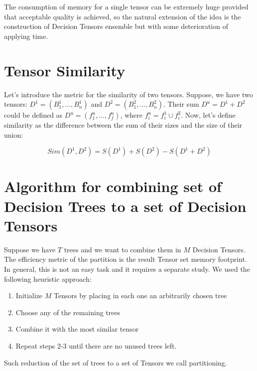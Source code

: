 \documentclass[a4paper]{jpconf}
\begin{document}
The consumption of memory for a single tensor can be extremely huge provided that acceptable quality is achieved, so the natural extension of the idea is the construction of Decision Tensors ensemble but with some deterioration of applying time.

\section{Tensor Similarity}
Let's introduce the metric for the similarity of two tensors. Suppose, we have two tensors: $D^1 = (B^{1}_{1}, ..., B^{1}_{n})$ and $D^2 = (B^{2}_{1}, ..., B^{2}_{n})$. Their sum $D^u = D^1 + D^2$ could be defined as $D^u = (f^{u}_{1}, ..., f^{u}_{f})$, where $f^{u}_{i} = f^{1}_{i} \cup f^{2}_{i}$. Now, let's define similarity as the difference between the sum of their sizes and the size of their union:

$$Sim(D^1, D^2) = S(D^1) + S(D^2) - S(D^1 + D^2)$$




\section{Algorithm for combining set of Decision Trees to a set of Decision Tensors}

Suppose we have $T$ trees and we want to combine them in $M$ Decision Tensors. The efficiency metric of the partition is the result Tensor set memory footprint.
In general, this is not an easy task and it requires a separate study. We used the following heuristic approach:
\medskip
\renewcommand{\theenumi}{\arabic{enumi}}
\begin{enumerate}
\item Initialize $M$ Tensors by placing in each one an arbitrarily chosen tree
\item Choose any of the remaining trees
\item Combine it with the most similar tensor
\item Repeat steps 2-3 until there are no unused trees left.
\end{enumerate}
Such reduction of the set of trees to a set of Tensors we call partitioning.
\end{document}
